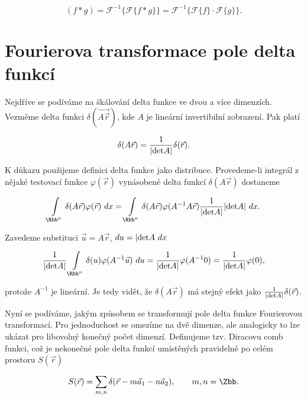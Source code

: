 \begin{equation}\label{eq:konv_FT}
(f \ast g) = \mathscr{F}^{-1}\{\mathscr{F}\{f \ast g \} \} = \mathscr{F}^{-1}\{\mathscr{F}\{f \} \cdot \mathscr{F}\{g\}\}.
\end{equation}

\section{Fourierova transformace pole delta funkcí}
\label{sec:delta_funkce}

Nejdříve se podíváme na škálování delta funkce ve dvou a více dimenzích. Vezměme delta funkci $\delta(\vec{A\vec{r}})$, kde $A$ je lineární invertibilní zobrazení. Pak platí

\begin{equation}
\delta(A\vec{r}) = \frac{1}{|{\rm det}A|}\delta(\vec{r}).
\end{equation}

K důkazu použijeme definici delta funkce jako distribuce. Provedeme-li integrál z nějaké testovací funkce $\varphi(\vec{r})$ vynásobené delta funkcí $\delta(A\vec{r})$ dostaneme

\begin{equation}
\int\limits_{\Rbb^n} \delta(A\vec{r})\varphi(\vec{r}) ~ dx =\int\limits_{\Rbb^n} \delta(A\vec{r})\varphi(A^{-1}A\vec{r})\frac{1}{|{\rm det}A|} |{\rm det}A| ~ dx.
\end{equation}

Zavedeme substituci $\vec{u}=A\vec{r}$, $du=|{\rm det}A~ dx$

\begin{equation}
\frac{1}{|{\rm det}A|} \int\limits_{\Rbb^n} \delta(u)\varphi(A^{-1}\vec{u}) ~ du = \frac{1}{|{\rm det}A|}\varphi(A^{-1}0) = \frac{1}{|{\rm det}A|}\varphi(0),
\end{equation}

protože $A^{-1}$ je lineární. Je tedy vidět, že $\delta(A\vec{r})$ má stejný efekt jako $\frac{1}{|{\rm det}A|} \delta(\vec{r})$. 

Nyní se podíváme, jakým způsobem se transformují pole delta funkce Fourierovou transformací. Pro jednoduchost se omezíme na dvě dimenze, ale analogicky to lze ukázat pro libovolný konečný počet dimenzí. Definujeme tzv. Diracovu comb funkci, což je nekonečné pole delta funkcí umístěných pravidelně po celém prostoru $S(\vec{r})$

\begin{equation}\label{eq:comb_general}
S(\vec{r}) = \sum\limits_{m,n} \delta(\vec{r}-m\vec{a}_1 - n\vec{a}_2), \qquad m,n = \Zbb.
\end{equation}

